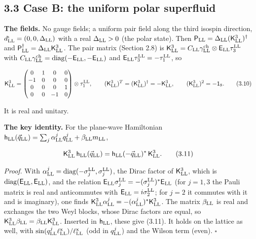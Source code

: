 \documentclass[
  10pt,
]{article}
\begin{document}
\hypertarget{case-b-the-uniform-polar-superfluid}{%
\subsection{3.3 Case B: the uniform polar
superfluid}\label{case-b-the-uniform-polar-superfluid}}

\textbf{The fields.} No gauge fields; a uniform pair field along the
third isospin direction, \(d^\iota_{\rm LL}=(0,0,\Delta_{\rm LL})\) with
a real \(\Delta_{\rm LL}>0\) (the polar state). Then
\(\mathsf P_{\rm LL}=\Delta_{\rm LL}(\mathsf K^3_{\rm LL})^\dagger\) and
\(\mathsf P^\dagger_{\rm LL}=\Delta_{\rm LL}\mathsf K^3_{\rm LL}\). The
pair matrix (Section 2.8) is
\(\mathsf K^3_{\rm LL}=C_{\rm LL}\gamma^{\rm ch}_{\rm LL}\otimes\mathsf E_{\rm LL}\tau^{\rm LL}_3\)
with
\(C_{\rm LL}\gamma^{\rm ch}_{\rm LL}=\mathrm{diag}(-\mathsf E_{\rm LL},-\mathsf E_{\rm LL})\)
and \(\mathsf E_{\rm LL}\tau^{\rm LL}_3=-\tau^{\rm LL}_1\), so

\[\mathsf K^3_{\rm LL}=\begin{pmatrix}0&1&0&0\\-1&0&0&0\\0&0&0&1\\0&0&-1&0\end{pmatrix}\otimes\tau^{\rm LL}_1,\qquad(\mathsf K^3_{\rm LL})^T=(\mathsf K^3_{\rm LL})^\dagger=-\mathsf K^3_{\rm LL},\qquad(\mathsf K^3_{\rm LL})^2=-\mathsf 1_8.\tag{3.10}\]

It is real and unitary.

\textbf{The key identity.} For the plane-wave Hamiltonian
\(\mathsf h_{\rm LL}(\vec q_{\rm LL})=\sum_j\alpha^j_{\rm LL}q^j_{\rm LL}+\beta_{\rm LL}m_{\rm LL}\),

\[\mathsf K^3_{\rm LL}\,\mathsf h_{\rm LL}(\vec q_{\rm LL})=\mathsf h_{\rm LL}(-\vec q_{\rm LL})^*\,\mathsf K^3_{\rm LL}.\tag{3.11}\]

\emph{Proof.} With
\(\alpha^j_{\rm LL}=\mathrm{diag}(-\sigma^{\rm LL}_j,\sigma^{\rm LL}_j)\),
the Dirac factor of \(\mathsf K^3_{\rm LL}\), which is
\(\mathrm{diag}(\mathsf E_{\rm LL},\mathsf E_{\rm LL})\), and the
relation
\(\mathsf E_{\rm LL}\sigma^{\rm LL}_j=-(\sigma^{\rm LL}_j)^*\mathsf E_{\rm LL}\)
(for \(j=1,3\) the Pauli matrix is real and anticommutes with
\(\mathsf E_{\rm LL}=i\sigma^{\rm LL}_2\); for \(j=2\) it commutes with
it and is imaginary), one finds
\(\mathsf K^3_{\rm LL}\alpha^j_{\rm LL}=-(\alpha^j_{\rm LL})^*\mathsf K^3_{\rm LL}\).
The matrix \(\beta_{\rm LL}\) is real and exchanges the two Weyl blocks,
whose Dirac factors are equal, so
\(\mathsf K^3_{\rm LL}\beta_{\rm LL}=\beta_{\rm LL}\mathsf K^3_{\rm LL}\).
Inserted in \(\mathsf h_{\rm LL}\), these give (3.11). It holds on the
lattice as well, with
\(\sin(q^j_{\rm LL}\ell^{\rm x}_{\rm LL})/\ell^{\rm x}_{\rm LL}\) (odd
in \(q^j_{\rm LL}\)) and the Wilson term (even). \(\square\)
\end{document}
